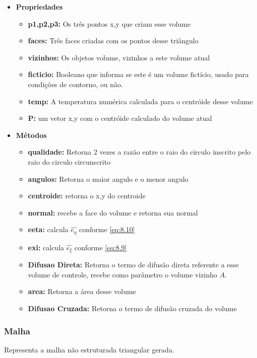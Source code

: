 \begin{itemize}
    \item \textbf{Propriedades}
    \begin{itemize}
        \item \textbf{p1,p2,p3:} Os três pontos x,y que criam esse volume
        \item \textbf{faces:} Três faces criadas com os pontos desse triângulo
        \item \textbf{vizinhos:} Os objetos volume, vizinhos a este volume atual
        \item \textbf{ficticio:} Booleano que informa se este é um volume fictício, usado para condições de contorno, ou não.
        \item \textbf{temp:} A temperatura numérica calculada para o centróide desse volume
        \item \textbf{P:} um vetor x,y com o centróide calculado do volume atual
    \end{itemize}
    \item \textbf{Métodos}
    \begin{itemize}
        \item \textbf{qualidade:} Retorna 2 vezes a razão entre o raio do circulo inscrito pelo raio do circulo circunscrito
        \item \textbf{angulos:} Retorna o maior angulo e o menor angulo
        \item \textbf{centroide:} retorna o x,y do centroide
        \item \textbf{normal:} recebe a face do volume e retorna sua normal
        \item \textbf{eeta:} calcula $\hat{e_\eta}$ conforme \ref{eq:8.10}
        \item \textbf{exi:} calcula $\hat{e_\xi}$ conforme \ref{eq:8.9}
        \item \textbf{Difusao Direta:} Retorna o termo de difusão direta referente a esse volume de controle, recebe como parâmetro o volume vizinho $A$.
        \item \textbf{area:} Retorna a área desse volume
        \item \textbf{Difusao Cruzada:} Retorna o termo de difusão cruzada do volume
    \end{itemize}
\end{itemize}

\subsubsection{Malha}
Representa a malha não estruturada triangular gerada.

